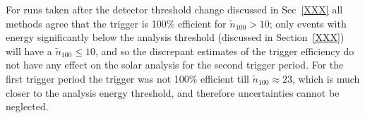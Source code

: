 For runs taken after the detector threshold change discussed in Sec~\ref{XXX}
all methods agree that the trigger is 100\% efficient for $\tilde{n}_{100} > 10$;
only events with energy significantly below the analysis threshold (discussed
in Section~\ref{XXX}) will have a $\tilde{n}_{100} \le 10$, and so the discrepant
estimates of the trigger
efficiency do not have any effect on the solar analysis for the second trigger period.
For the first trigger period the trigger was not 100\% efficient till
$\tilde{n}_{100} \approx 23$, which is much closer to the analysis energy
threshold, and therefore uncertainties cannot be neglected.
